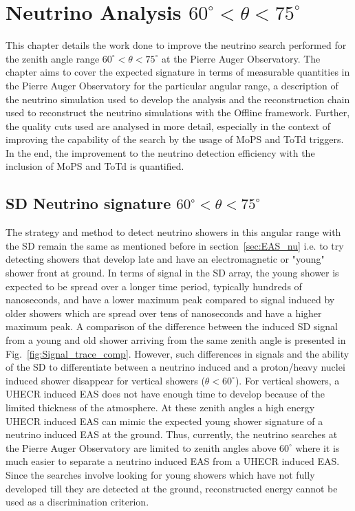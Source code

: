 
\chapter{Neutrino Analysis \texorpdfstring{$60^\circ < \theta < 75^\circ$}{}}
\label{chap:DGL}
This chapter details the work done to improve the neutrino search performed for the zenith angle range $60^\circ < \theta < 75^\circ$ at the Pierre Auger Observatory. The chapter aims to cover the expected signature in terms of measurable quantities in the Pierre Auger Observatory for the particular angular range, a description of the neutrino simulation used to develop the analysis and the reconstruction chain used to reconstruct the neutrino simulations with the Offline framework. Further, the quality cuts used are analysed in more detail, especially in the context of improving the capability of the search by the usage of MoPS and ToTd triggers. In the end, the improvement to the neutrino detection efficiency with the inclusion of MoPS and ToTd is quantified.


\section{SD Neutrino signature \texorpdfstring{$60^{\circ} < \theta < 75^{\circ}$}{}}
\label{sec:sig_DGL}

The strategy and method to detect neutrino showers in this angular range with the SD remain the same as mentioned before in section~\ref{sec:EAS_nu} i.e. to try detecting showers that develop late and have an electromagnetic or "young" shower front at ground. In terms of signal in the SD array, the young shower is expected to be spread over a longer time period, typically hundreds of nanoseconds, and have a lower maximum peak compared to signal induced by older showers which are spread over tens of nanoseconds and have a higher maximum peak. A comparison of the difference between the induced SD signal from a young and old shower arriving from the same zenith angle is presented in Fig.~\ref{fig:Signal_trace_comp}. However, such differences in signals and the ability of the SD to differentiate between a neutrino induced and a proton/heavy nuclei induced shower disappear for vertical showers ($\theta < 60^{\circ}$). For vertical showers, a UHECR induced EAS does not have enough time to develop because of the limited thickness of the atmosphere. At these zenith angles a high energy UHECR induced EAS can mimic the expected young shower signature of a neutrino induced EAS at the ground. Thus, currently, the neutrino searches at the Pierre Auger Observatory are limited to zenith angles above $60^\circ$ where it is much easier to separate a neutrino induced EAS from a UHECR induced EAS. Since the searches involve looking for young showers which have not fully developed till they are detected at the ground, reconstructed energy cannot be used as a discrimination criterion.

